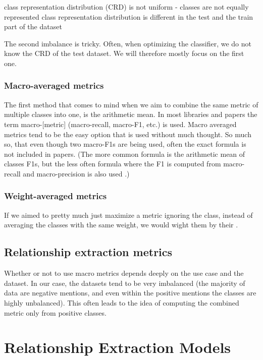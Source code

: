 class representation distribution (CRD) is not uniform - classes are not equally represented 
class representation distribution is different in the test and the train part of the dataset

The second imbalance is tricky. Often, when optimizing the classifier, we do not know the CRD of the test dataset. We will therefore mostly focus on the first one. 


\subsubsection{Macro-averaged metrics}

The first method that comes to mind when we aim to combine the same metric of multiple classes into one, is the arithmetic mean. In most libraries and papers the term macro-[metric] (macro-recall, macro-F1, etc.) is used.  Macro averaged metrics tend to be the easy option that is used without much thought. So much so, that even though two macro-F1s are being used, often the exact formula is not included in papers. (The more common formula is the arithmetic mean of classes F1s, but the less often formula where the F1 is computed from macro-recall and macro-precision is also used \cite{Opitz2019MacroFA}.)

\subsubsection{Weight-averaged metrics}
If we aimed to pretty much just maximize a metric ignoring the class, instead of averaging the classes with the same weight, we would wight them by their . 


\subsection{Relationship extraction metrics}
Whether or not to use macro metrics depends deeply on the use case and the dataset. In our case, the datasets tend to be very imbalanced (the majority of data are negative mentions, and even within the positive mentions the classes are highly unbalanced). This often leads to the idea of computing the combined metric only from positive classes.







\section{Relationship Extraction Models}


